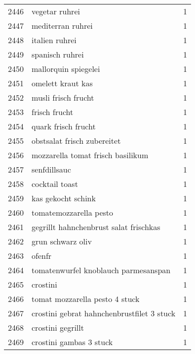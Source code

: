 \begin{tabular}{llr}
2446 &                                     vegetar ruhrei &      1 \\
2447 &                                  mediterran ruhrei &      1 \\
2448 &                                     italien ruhrei &      1 \\
2449 &                                    spanisch ruhrei &      1 \\
2450 &                               mallorquin spiegelei &      1 \\
2451 &                                  omelett kraut kas &      1 \\
2452 &                                musli frisch frucht &      1 \\
2453 &                                      frisch frucht &      1 \\
2454 &                                quark frisch frucht &      1 \\
2455 &                        obstsalat frisch zubereitet &      1 \\
2456 &                  mozzarella tomat frisch basilikum &      1 \\
2457 &                                       senfdillsauc &      1 \\
2458 &                                     cocktail toast &      1 \\
2459 &                                 kas gekocht schink &      1 \\
2460 &                             tomatemozzarella pesto &      1 \\
2461 &             gegrillt hahnchenbrust salat frischkas &      1 \\
2462 &                                  grun schwarz oliv &      1 \\
2463 &                                             ofenfr &      1 \\
2464 &               tomatenwurfel knoblauch parmesanspan &      1 \\
2465 &                                           crostini &      1 \\
2466 &                     tomat mozzarella pesto 4 stuck &      1 \\
2467 &         crostini gebrat hahnchenbrustfilet 3 stuck &      1 \\
2468 &                                  crostini gegrillt &      1 \\
2469 &                            crostini gambas 3 stuck &      1 \\

\end{tabular}
